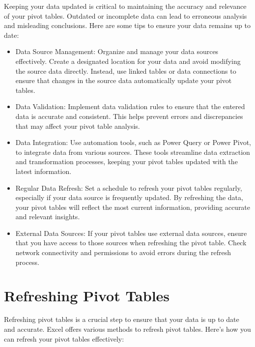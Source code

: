 \documentclass[
]{book}
\begin{document}
Keeping your data updated is critical to maintaining the accuracy and relevance of your pivot tables. Outdated or incomplete data can lead to erroneous analysis and misleading conclusions. Here are some tips to ensure your data remains up to date:

\begin{itemize}
\item
  Data Source Management: Organize and manage your data sources effectively. Create a designated location for your data and avoid modifying the source data directly. Instead, use linked tables or data connections to ensure that changes in the source data automatically update your pivot tables.
\item
  Data Validation: Implement data validation rules to ensure that the entered data is accurate and consistent. This helps prevent errors and discrepancies that may affect your pivot table analysis.
\item
  Data Integration: Use automation tools, such as Power Query or Power Pivot, to integrate data from various sources. These tools streamline data extraction and transformation processes, keeping your pivot tables updated with the latest information.
\item
  Regular Data Refresh: Set a schedule to refresh your pivot tables regularly, especially if your data source is frequently updated. By refreshing the data, your pivot tables will reflect the most current information, providing accurate and relevant insights.
\item
  External Data Sources: If your pivot tables use external data sources, ensure that you have access to those sources when refreshing the pivot table. Check network connectivity and permissions to avoid errors during the refresh process.
\end{itemize}

\hypertarget{refreshing-pivot-tables}{%
\section{Refreshing Pivot Tables}\label{refreshing-pivot-tables}}

Refreshing pivot tables is a crucial step to ensure that your data is up to date and accurate. Excel offers various methods to refresh pivot tables. Here's how you can refresh your pivot tables effectively:
\end{document}
